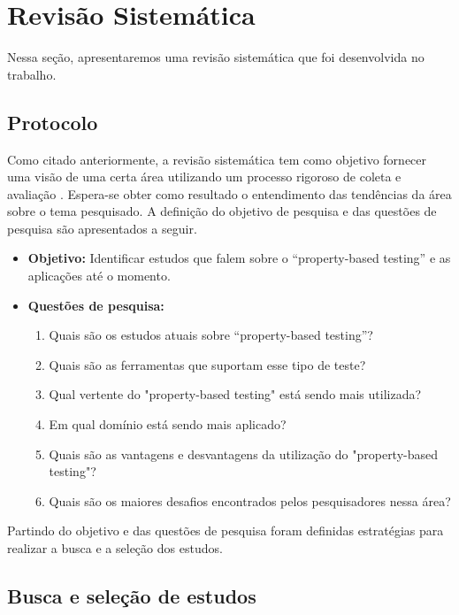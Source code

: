 \section{Revisão Sistemática} \label{sec:revisao_sistematica}


Nessa seção, apresentaremos uma revisão sistemática que foi desenvolvida no trabalho. 

\subsection{Protocolo}

Como citado anteriormente, a revisão sistemática tem como objetivo fornecer uma visão de uma certa área utilizando um processo rigoroso de coleta e avaliação \cite{petersen2008systematic}. Espera-se obter como resultado o entendimento das tendências da área sobre o tema pesquisado.  A definição do objetivo de pesquisa e das questões de pesquisa são apresentados a seguir. 

\begin{itemize}
    \item \textbf{Objetivo:} Identificar estudos que falem sobre o “property-based testing” e as aplicações até o momento.
    \item \textbf{Questões de pesquisa:} 
    \begin{enumerate}
        \item Quais são os estudos atuais sobre “property-based testing”?
        \item Quais são as ferramentas que suportam esse tipo de teste?
        \item Qual vertente do "property-based testing" está sendo mais utilizada?
        \item Em qual domínio está sendo mais aplicado?
        \item Quais são as vantagens e desvantagens da utilização do "property-based testing"?
        \item Quais são os maiores desafios encontrados pelos pesquisadores nessa área?
    \end{enumerate}
\end{itemize}

Partindo do objetivo e das questões de pesquisa foram definidas estratégias para realizar a busca e a seleção dos estudos.

\subsection{Busca e seleção de estudos}

